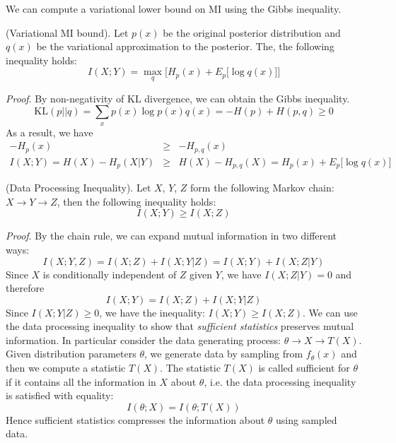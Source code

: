 We can compute a variational lower bound on MI using the Gibbs inequality.
\begin{theorem}
(Variational MI bound). Let $p(x)$ be the original posterior distribution and $q(x)$ be the variational approximation to the posterior. The, the following inequality holds:
\begin{equation}
    I(X;Y) = \max_q \bigg[H_p(x) + E_p\big[\log q(x)\big]\bigg]
\end{equation}
\end{theorem}
\textit{Proof}. By non-negativity of KL divergence, we can obtain the Gibbs inequality.
\begin{equation}
    \mathrm{KL}(p||q) = \sum_x p(x) \log {p(x)}{q(x)} = -H(p) + H(p,q) \geq 0
\end{equation}
As a result, we have
\begin{eqnarray}
    -H_p(x) &\geq& -H_{p,q}(x) \\
    I(X;Y) = H(X) - H_p(X|Y) &\geq& H(X) - H_{p,q}(X) = H_p(x) + E_p\big[\log q(x) \big]
\end{eqnarray}

\begin{theorem}
(Data Processing Inequality). Let $X$, $Y$, $Z$ form the following Markov chain: $X\rightarrow Y\rightarrow Z$, then the following inequality holds:
\begin{equation}
    I(X;Y) \geq I(X;Z)
\end{equation}
\end{theorem}
\textit{Proof}. By the chain rule, we can expand mutual information in two different ways:
\begin{equation}
    I(X;Y,Z) = I(X;Z) + I(X;Y|Z) = I(X;Y) + I(X;Z|Y)
\end{equation}
Since $X$ is conditionally independent of $Z$ given $Y$, we have $I(X;Z|Y) = 0$ and therefore
\begin{equation}
    I(X;Y) = I(X;Z) + I(X;Y|Z)
\end{equation}
Since $I(X;Y|Z) \geq 0$, we have the inequality: $I(X;Y)\geq I(X;Z)$.
We can use the data processing inequality to show that \textit{sufficient statistics} preserves mutual information. In particular consider the data generating process: $\theta \rightarrow X \rightarrow T(X)$. Given distribution parameters $\theta$, we generate data by sampling from $f_{\theta}(x)$ and then we compute a statistic $T(X)$. The statistic $T(X)$ is called sufficient for $\theta$ if it contains all the information in $X$ about $\theta$, i.e. the data processing inequality is satisfied with equality:
\begin{equation}
    I(\theta; X) = I(\theta; T(X))
\end{equation}
Hence sufficient statistics compresses the information about $\theta$ using sampled data.\\

